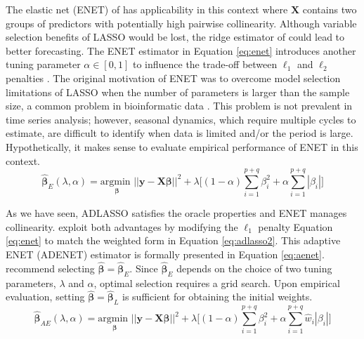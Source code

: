 The elastic net (ENET) of \cite{Zou2005} has applicability in this context where $\bm{X}$ contains two groups of predictors with potentially high pairwise collinearity. Although variable selection benefits of LASSO would be lost, the ridge estimator of \cite{Hoerl1970} could lead to better forecasting. The ENET estimator in Equation \ref{eq:enet}  introduces another tuning parameter $\alpha\in[0,1]$ to influence the trade-off between $\ell_1$ and $\ell_2$ penalties \citep{DeMol2009}. The original motivation of ENET was to overcome model selection limitations of LASSO when the number of parameters is larger than the sample size, a common problem in bioinformatic data \citep{Zou2005}. This problem is not prevalent in time series analysis; however, seasonal dynamics, which require multiple cycles to estimate, are difficult to identify when data is limited and/or the period is large. Hypothetically, it makes sense to evaluate empirical performance of ENET in this context.
\begin{equation}
\label{eq:enet}
\hat{\bm{\beta}}_{E} (\lambda,\alpha)= \underset{\bm{\beta}}{\textrm{argmin }}  ||\bm{y}-\bm{X}\bm{\beta}||^2 + \lambda\bigg[ (1-\alpha) \sum\limits_{i=1}^{p+q} \beta^2_i+ \alpha\sum\limits_{i=1}^{p+q} |\beta_i| \bigg]
\end{equation}

As we have seen, ADLASSO satisfies the oracle properties \citep{Zou2006} and ENET \citep{Zou2005} manages collinearity. \cite{Zou2009a} exploit both advantages by modifying the $\ell_1$ penalty Equation \ref{eq:enet} to match the weighted form in Equation \ref{eq:adlasso2}. This adaptive ENET (ADENET) estimator is formally presented in Equation \ref{eq:aenet}. \cite{Zou2009a} recommend selecting $\hat{\bm{\beta}}=\hat{\bm{\beta}}_{E}$. Since $\hat{\bm{\beta}}_{E}$ depends on the choice of two tuning parameters, $\lambda$ and $\alpha$, optimal selection requires a grid search. Upon empirical evaluation, setting $\hat{\bm{\beta}}=\hat{\bm{\beta}}_{L}$ is sufficient for obtaining the initial weights.
\begin{equation}
\label{eq:aenet}
\hat{\bm{\beta}}_{AE} (\lambda,\alpha)= \underset{\bm{\beta}}{\textrm{argmin }}  ||\bm{y}-\bm{X}\bm{\beta}||^2 + \lambda\bigg[ (1-\alpha)  \sum\limits_{i=1}^{p+q} \beta^2_i+ \alpha\sum\limits_{i=1}^{p+q} \hat{w}_{i}|\beta_i| \bigg]
\end{equation}


